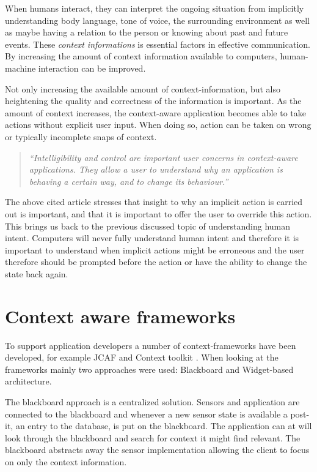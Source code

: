 \documentclass[../report.tex]{subfiles}
\begin{document}
When humans interact, they can interpret the ongoing situation from implicitly understanding body language, tone of voice, the surrounding environment as well as maybe having a relation to the person or knowing about past and future events. These \textit{context informations} is essential factors in effective communication. By increasing the amount of context information available to computers, human-machine interaction can be improved.



Not only increasing the available amount of context-information, but also heightening the quality and correctness of the information is important. As the amount of context increases, the context-aware application becomes able to take actions without explicit user input. When doing so, action can be taken on wrong or typically incomplete snaps of context. 


\begin{quote}
\textit{``Intelligibility and control are important user concerns in context-aware applications. They allow a user to understand why an application is behaving a certain way, and to change its behaviour.''} \cite{Dey and Newberger (2009)}
\end{quote} 

The above cited article stresses that insight to why an implicit action is carried out is important, and that it is important to offer the user to override this action. This brings us back to the previous discussed topic of understanding human intent. Computers will never fully understand human intent and therefore it is important to understand when implicit actions might be erroneous and the user therefore should be prompted before the action or have the ability to change the state back again.

\section{Context aware frameworks}
To support application developers a number of context-frameworks have been developed, for example JCAF and Context toolkit  \cite{Context-aware computing (2010)}. When looking at the frameworks mainly two approaches were used: Blackboard and Widget-based architecture.

The blackboard approach is a centralized solution. Sensors and application are connected to the blackboard and whenever a new sensor state is available a post-it, an entry to the database, is put on the blackboard. The application can at will look through the blackboard and search for context it might find relevant. The blackboard abstracts away the sensor implementation allowing the client to focus on only the context information. 
\end{document}
